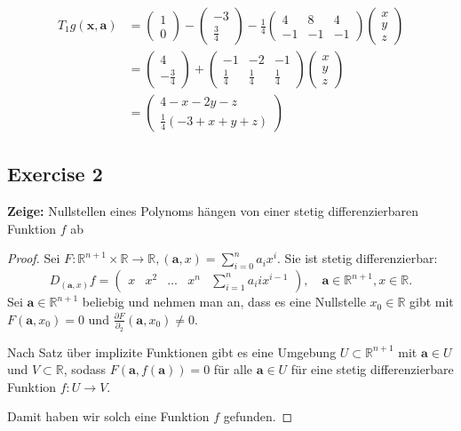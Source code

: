 \documentclass[a4paper]{article}
\renewcommand{\hline}{\noindent\makebox[\linewidth]{\rule{12cm}{1pt}}}
\begin{document}
\begin{align*}
	T_1g(\mathbf x, \mathbf a) &= \begin{pmatrix}
	1 \\ 0 
	\end{pmatrix} - \begin{pmatrix}
		-3 \\ \frac{3}{4}
	\end{pmatrix} - \frac{1}{4}\begin{pmatrix}
		4 & 8 & 4 \\
		-1 & -1 & -1
	\end{pmatrix} \begin{pmatrix}
		x \\ y \\ z
	\end{pmatrix}  \\
	&= \begin{pmatrix}
		4 \\ -\frac{3}{4}
	\end{pmatrix} + \begin{pmatrix}
		-1 & -2 & -1 \\ \frac{1}{4} & \frac{1}{4} & \frac{1}{4}
	\end{pmatrix}\begin{pmatrix}
	x \\ y \\ z
	\end{pmatrix} \\
	&= \begin{pmatrix}
	4 -x -2y - z \\
	\frac{1}{4}(- 3 + x + y + z)
	\end{pmatrix}
\end{align*}

\hline


\subsection*{Exercise 2}
\textbf{Zeige:} Nullstellen eines Polynoms hängen  von einer stetig differenzierbaren Funktion $f$ ab

\begin{proof}
Sei $F: \mathbb R^{n+1} \times \mathbb R \to \mathbb R, (\mathbf a, x) = \sum^n_{i=0}a_i x^{i}$. Sie ist stetig differenzierbar:
\[
	D_{(\mathbf a,x)}f = \begin{pmatrix}
		x & x^2 & ... & x^n & \sum^n_{i=1} a_iix^{i-1}
	\end{pmatrix}, \quad \mathbf a \in \mathbb R^{n+1}, x \in \mathbb R.
\]
Sei $\mathbf a \in \mathbb R^{n+1}$ beliebig und nehmen man an, dass es eine Nullstelle $x_0 \in \mathbb R$ gibt mit $F(\mathbf a, x_0) = 0$ und $\frac{\partial F}{\partial_2}(\mathbf a, x_0) \neq 0$. 

Nach Satz über implizite Funktionen gibt es eine Umgebung $U \subset \mathbb R^{n+1}$ mit $\mathbf a \in U$ und $V \subset \mathbb R$, sodass $F(\mathbf a, f(\mathbf a)) = 0$ für alle $\mathbf a \in U$ für eine stetig differenzierbare Funktion $f: U \to V$.

Damit haben wir solch eine Funktion $f$ gefunden.
\end{proof}
\end{document}
